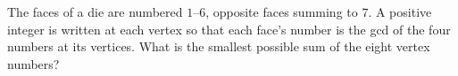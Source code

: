 The faces of a die are numbered $1$--$6$, opposite faces summing to $7$. A positive integer is written at each vertex so that each face's number is the gcd of the four numbers at its vertices. What is the smallest possible sum of the eight vertex numbers?
